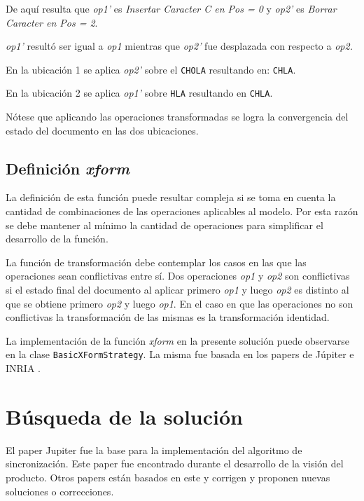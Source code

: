 \documentclass[12pt,a4paper]{article}
\begin{document}
	De aquí resulta que \textit{op1’} es \textit{Insertar Caracter C en Pos = 0} y \textit{op2’} es 
	\textit{Borrar Caracter en Pos = 2}.

\textit{op1’} resultó ser igual a \textit{op1} mientras que \textit{op2’} fue desplazada con respecto a 
\textit{op2.}

En la ubicación 1 se aplica \textit{op2’} sobre el \texttt{CHOLA} resultando en: \texttt{CHLA}.

En la ubicación 2 se aplica \textit{op1’} sobre \texttt{HLA} resultando en \texttt{CHLA}.

Nótese que aplicando las operaciones transformadas se logra la convergencia del estado del documento 
en las dos ubicaciones.

\subsection{Definición \textit{xform}}

La definición de esta función puede resultar compleja si se toma en cuenta la cantidad de 
combinaciones de las operaciones aplicables al modelo. Por esta razón se debe mantener al mínimo la 
cantidad de operaciones para simplificar el desarrollo de la función.

La función de transformación debe contemplar los casos en las que las operaciones sean conflictivas entre 
sí. Dos operaciones \textit{op1} y \textit{op2} son conflictivas si el estado final del documento al aplicar 
primero \textit{op1} y luego \textit{op2} es distinto al que se obtiene primero \textit{op2} y luego \textit{op1}.
En el caso en que las operaciones no son conflictivas la transformación de las mismas es la transformación 
identidad.

La implementación de la función \textit{xform} en la presente solución puede observarse en la clase 
\texttt{BasicXFormStrategy}. La misma fue basada en los papers de Júpiter e INRIA \cite{inria}.  %

	\section{Búsqueda de la solución}

El paper Jupiter\cite{jupiter} fue la base para la implementación del algoritmo de sincronización. Este paper fue 
encontrado durante el desarrollo de la visión del producto. Otros papers están basados en este y
corrigen y proponen nuevas soluciones o correcciones.
\end{document}
